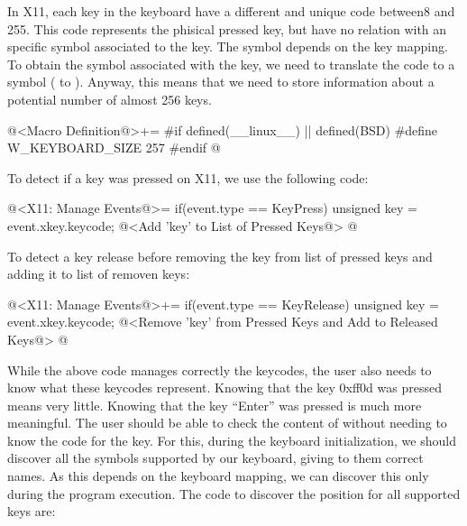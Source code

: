 In X11, each key in the keyboard have a different and unique code
between8 and 255. This code represents the phisical pressed key, but
have no relation with an specific symbol associated to the key. The
symbol depends on the key mapping. To obtain the symbol associated
with the key, we need to translate the code to a symbol
( to ). Anyway, this means that
we need to store information about a potential number of almost 256
keys.

\iniciocodigo
@<Macro Definition@>+=
#if defined(__linux__) || defined(BSD)
#define W_KEYBOARD_SIZE 257
#endif
@
\fimcodigo

To detect if a key was pressed on X11, we use the following code:

\iniciocodigo
@<X11: Manage Events@>=
if(event.type == KeyPress){
  unsigned key = event.xkey.keycode;
  @<Add 'key' to List of Pressed Keys@>
}
@
\fimcodigo

To detect a key release before removing the key from list of pressed
keys and adding it to list of removen keys:

\iniciocodigo
@<X11: Manage Events@>+=
if(event.type == KeyRelease){
  unsigned key = event.xkey.keycode;
  @<Remove 'key' from Pressed Keys and Add to Released Keys@>
}
@
\fimcodigo

While the above code manages correctly the keycodes, the user also
needs to know what these keycodes represent. Knowing that the key
0xff0d was pressed means very little. Knowing that the key ``Enter''
was pressed is much more meaningful. The user should be able to check
the content of  without needing
to know the code for the key. For this, during the keyboard
initialization, we should discover all the symbols supported by our
keyboard, giving to them correct names. As this depends on the
keyboard mapping, we can discover this only during the program
execution. The code to discover the position for all supported keys
are:

